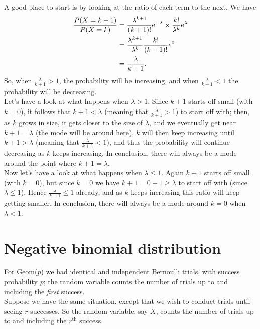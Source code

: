 \noindent A good place to start is by looking at the ratio of each term to the next. We have
\begin{align*}
\frac{P(X = k+1)}{P(X=k)} & = \frac{\lambda^{k+1}}{(k+1)!}\mathrm{e}^{-\lambda} \times \frac{k!}{\lambda^k}\mathrm{e}^{\lambda}  \\
	& = \frac{\lambda^{k+1}}{\lambda^k}\frac{k!}{(k+1)!}e^0 \\
	& = \frac{\lambda}{k+1}.
\end{align*}
So, when $\frac{\lambda}{k+1} > 1$, the probability will be increasing, and when $\frac{\lambda}{k+1} < 1$ the probability will be decreasing. \\

\noindent Let's have a look at what happens when $\lambda > 1$. Since $k+1$ starts off small (with $k = 0$), it follows that $k+1 < \lambda$ (meaning that $\frac{\lambda}{k+1} > 1$) to start off with; then, as $k$ grows in size, it gets closer to the size of $\lambda$, and we eventually get near $k+1 = \lambda$ (the mode will be around here), $k$ will then keep increasing until $k + 1 > \lambda$ (meaning that $\frac{\lambda}{k+1} < 1$), and thus the probability will continue decreasing as $k$ keeps increasing. In conclusion, there will always be a mode around the point where $k+1 = \lambda$.  \\

\noindent Now let's have a look at what happens when $\lambda \leq 1$. Again $k+1$ starts off small (with $k = 0$), but since $k = 0$ we have $k+1 = 0 + 1 \geq \lambda$ to start off with (since $\lambda \leq 1$). Hence $\frac{\lambda}{k+1} \leq 1$ already, and as $k$ keeps increasing this ratio will keep getting smaller. In conclusion, there will always be a mode around $k = 0$ when $\lambda < 1$.  

\section{Negative binomial distribution} \label{negbin(r,p)}
For Geom($p$) we had identical and independent Bernoulli trials, with success probability $p$; the random variable counts the number of trials up to and including the \textit{first} success. \\

\noindent Suppose we have the same situation, except that we wish to conduct trials until seeing $r$ successes. So the random variable, say $X$, counts the number of trials up to and including the $r^{\text{th}}$ success. \\

